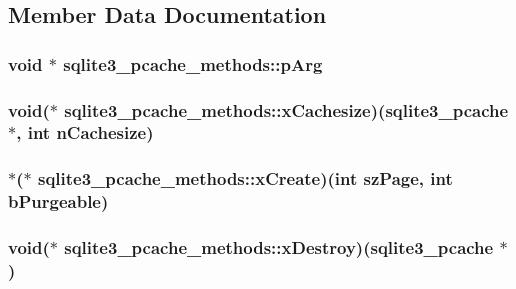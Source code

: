 

\subsection{Member Data Documentation}
\hypertarget{structsqlite3__pcache__methods_a90394a920f6a09dd13553aeb79bbed88}{
\subsubsection[{p\-Arg}]{\setlength{\rightskip}{0pt plus 5cm}void $\ast$ sqlite3\-\_\-pcache\-\_\-methods\-::p\-Arg}}\label{structsqlite3__pcache__methods_a90394a920f6a09dd13553aeb79bbed88}
\hypertarget{structsqlite3__pcache__methods_a9cf385dbec7f0d19793e2616a73a3b7f}{
\subsubsection[{x\-Cachesize}]{\setlength{\rightskip}{0pt plus 5cm}void($\ast$ sqlite3\-\_\-pcache\-\_\-methods\-::x\-Cachesize)({\bf sqlite3\-\_\-pcache} $\ast$, int n\-Cachesize)}}\label{structsqlite3__pcache__methods_a9cf385dbec7f0d19793e2616a73a3b7f}
\hypertarget{structsqlite3__pcache__methods_a36b1da95aeb7972c3c0d358aedf2a3d4}{
\subsubsection[{x\-Create}]{ $\ast$($\ast$ sqlite3\-\_\-pcache\-\_\-methods\-::x\-Create)(int sz\-Page, int b\-Purgeable)}}\label{structsqlite3__pcache__methods_a36b1da95aeb7972c3c0d358aedf2a3d4}
\hypertarget{structsqlite3__pcache__methods_aac18fc581d8d63550a6657016c24ba5d}{
\subsubsection[{x\-Destroy}]{\setlength{\rightskip}{0pt plus 5cm}void($\ast$ sqlite3\-\_\-pcache\-\_\-methods\-::x\-Destroy)({\bf sqlite3\-\_\-pcache} $\ast$)}}\label{structsqlite3__pcache__methods_aac18fc581d8d63550a6657016c24ba5d}
